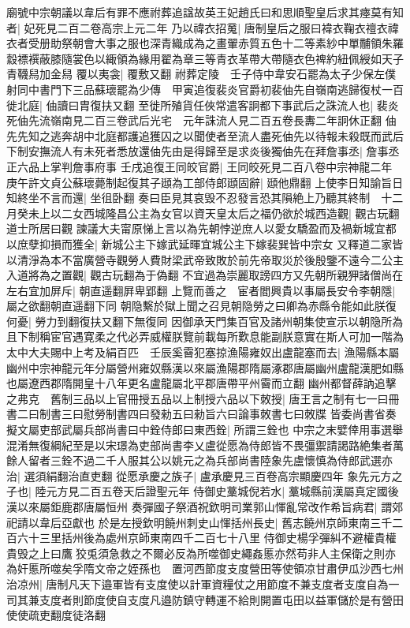 廟號中宗朝議以韋后有罪不應祔葬追諡故英王妃趙氏曰和思順聖皇后求其瘞莫有知者|{
	妃死見二百二卷高宗上元二年}
乃以禕衣招䰟|{
	唐制皇后之服曰褘衣鞠衣䄠衣禕衣者受册助祭朝會大事之服也深青織成為之畫翬赤質五色十二等素紗中單黼領朱羅縠褾襈蔽膝隨裳色以緅領為緣用翟為章三等青衣革帶大帶隨衣色禆約紐佩綬如天子青韈舄加金舄}
覆以夷衾|{
	覆敷又翻}
祔葬定陵　壬子侍中韋安石罷為太子少保左僕射同中書門下三品蘇瓌罷為少傳　甲寅追復裴炎官爵初裴伷先自嶺南逃歸復杖一百徙北庭|{
	伷讀曰胄復扶又翻}
至徙所殖貨任俠常遣客詗都下事武后之誅流人也|{
	裴炎死伷先流嶺南見二百三卷武后光宅　元年誅流人見二百五卷長夀二年詗休正翻}
伷先先知之逃奔胡中北庭都護追獲囚之以聞使者至流人盡死伷先以待報未殺既而武后下制安撫流人有未死者悉放還伷先由是得歸至是求炎後獨伷先在拜詹事丞|{
	詹事丞正六品上掌判詹事府事}
壬戌追復王同皎官爵|{
	王同皎死見二百八卷中宗神龍二年}
庚午許文貞公蘇瓌薨制起復其子頲為工部侍郎頲固辭|{
	頲他鼎翻}
上使李日知諭旨日知終坐不言而還|{
	坐徂卧翻}
奏曰臣見其哀毁不忍發言恐其隕絶上乃聽其終制　十二月癸未上以二女西城隆昌公主為女官以資天皇太后之福仍欲於城西造觀|{
	觀古玩翻道士所居曰觀}
諫議大夫甯原悌上言以為先朝悖逆庶人以愛女驕盈而及禍新城宜都以庶孽抑損而獲全|{
	新城公主下嫁武延暉宜城公主下嫁裴巽皆中宗女}
又釋道二家皆以清淨為本不當廣營寺觀勞人費財梁武帝致敗於前先帝取災於後殷鑒不遠今二公主入道將為之置觀|{
	觀古玩翻為于偽翻}
不宜過為崇麗取謗四方又先朝所親狎諸僧尚在左右宜加屏斥|{
	朝直遥翻屛卑郢翻}
上覽而善之　宦者閻興貴以事屬長安令李朝隱|{
	屬之欲翻朝直遥翻下同}
朝隐繫於獄上聞之召見朝隐勞之曰卿為赤縣令能如此朕復何憂|{
	勞力到翻復扶又翻下無復同}
因御承天門集百官及諸州朝集使宣示以朝隐所為且下制稱宦官遇寛柔之代必弄威權朕覽前載每所歎息能副朕意實在斯人可加一階為太中大夫賜中上考及絹百匹　壬辰奚霫犯塞掠漁陽雍奴出盧龍塞而去|{
	漁陽縣本屬幽州中宗神龍元年分屬營州雍奴縣漢以來屬漁陽郡隋屬涿郡唐屬幽州盧龍漢肥如縣也屬遼西郡隋開皇十八年更名盧龍屬北平郡唐帶平州霫而立翻}
幽州都督薛訥追擊之弗克　舊制三品以上官冊授五品以上制授六品以下敇授|{
	唐王言之制有七一曰冊書二曰制書三曰慰勞制書四曰發勑五曰勑旨六曰論事敇書七曰敇牒}
皆委尚書省奏擬文屬吏部武屬兵部尚書曰中銓侍郎曰東西銓|{
	所謂三銓也}
中宗之末嬖倖用事選舉混淆無復綱紀至是以宋璟為吏部尚書李乂盧從愿為侍郎皆不畏彊禦請謁路絶集者萬餘人留者三銓不過二千人服其公以姚元之為兵部尚書陸象先盧懷慎為侍郎武選亦治|{
	選須絹翻治直吏翻}
從愿承慶之族子|{
	盧承慶見三百卷高宗顯慶四年}
象先元方之子也|{
	陸元方見二百五卷天后證聖元年}
侍御史藳城倪若水|{
	藳城縣前漢屬真定國後漢以來屬鉅鹿郡唐屬恒州}
奏彈國子祭酒祝欽明司業郭山惲亂常改作希旨病君|{
	謂郊祀請以韋后亞獻也}
於是左授欽明饒州刺史山惲括州長史|{
	舊志饒州京師東南三千二百六十三里括州後為處州京師東南四千二百七十八里}
侍御史楊孚彈糾不避權貴權貴毁之上曰鷹狡兎須急救之不爾必反為所噬御史繩姦慝亦然苟非人主保衛之則亦為奸慝所噬矣孚隋文帝之姪孫也　置河西節度支度營田等使領凉甘肅伊瓜沙西七州治凉州|{
	唐制凡天下邉軍皆有支度使以計軍資糧仗之用節度不兼支度者支度自為一司其兼支度者則節度使自支度凡邉防鎮守轉運不給則開置屯田以益軍儲於是有營田使使疏吏翻度徒洛翻}
